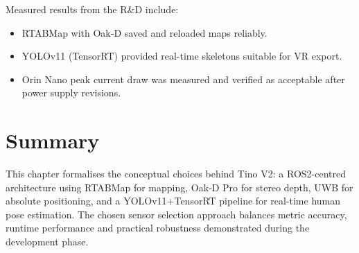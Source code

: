 Measured results from the R\&D include:
\begin{itemize}[nosep]
	\item RTABMap with Oak‑D saved and reloaded maps reliably.
	\item YOLOv11 (TensorRT) provided real-time skeletons suitable for VR export.
	\item Orin Nano peak current draw was measured and verified as acceptable after power supply revisions.
\end{itemize}

\section{Summary}

This chapter formalises the conceptual choices behind Tino V2: a ROS2-centred architecture using RTABMap for mapping, Oak‑D Pro for stereo depth, UWB for absolute positioning, and a YOLOv11+TensorRT pipeline for real-time human pose estimation. The chosen sensor selection approach balances metric accuracy, runtime performance and practical robustness demonstrated during the development phase.

